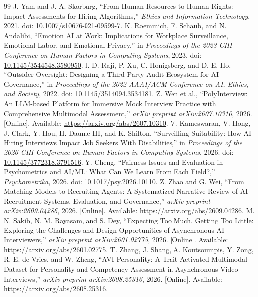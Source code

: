 \documentclass[journal]{IEEEtran}
\begin{document}
\begin{thebibliography}{99}
 J. Yam and J. A. Skorburg, ``From Human Resources to Human Rights: Impact Assessments for Hiring Algorithms,'' \emph{Ethics and Information Technology}, 2021. doi: \href{https://doi.org/10.1007/s10676-021-09599-7}{10.1007/s10676-021-09599-7}.
 K. Roemmich, F. Schaub, and N. Andalibi, ``Emotion AI at Work: Implications for Workplace Surveillance, Emotional Labor, and Emotional Privacy,'' in \emph{Proceedings of the 2023 CHI Conference on Human Factors in Computing Systems}, 2023. doi: \href{https://doi.org/10.1145/3544548.3580950}{10.1145/3544548.3580950}.
 I. D. Raji, P. Xu, C. Honigsberg, and D. E. Ho, ``Outsider Oversight: Designing a Third Party Audit Ecosystem for AI Governance,'' in \emph{Proceedings of the 2022 AAAI/ACM Conference on AI, Ethics, and Society}, 2022. doi: \href{https://doi.org/10.1145/3514094.3534181}{10.1145/3514094.3534181}.
 Z. Wen et al., ``PolyInterview: An LLM-based Platform for Immersive Mock Interview Practice with Comprehensive Multimodal Assessment,'' \emph{arXiv preprint arXiv:2607.10310}, 2026. [Online]. Available: \url{https://arxiv.org/abs/2607.10310}.
 V. Kameswaran, V. Hong, J. Clark, Y. Hou, H. Daume III, and K. Shilton, ``Surveilling Suitability: How AI Hiring Interviews Impact Job Seekers With Disabilities,'' in \emph{Proceedings of the 2026 CHI Conference on Human Factors in Computing Systems}, 2026. doi: \href{https://doi.org/10.1145/3772318.3791516}{10.1145/3772318.3791516}.
 Y. Cheng, ``Fairness Issues and Evaluation in Psychometrics and AI/ML: What Can We Learn From Each Field?,'' \emph{Psychometrika}, 2026. doi: \href{https://doi.org/10.1017/psy.2026.10110}{10.1017/psy.2026.10110}.
 Z. Zhao and G. Wei, ``From Matching Models to Recruiting Agents: A Systematized Narrative Review of AI Recruitment Systems, Evaluation, and Governance,'' \emph{arXiv preprint arXiv:2609.04286}, 2026. [Online]. Available: \url{https://arxiv.org/abs/2609.04286}.
 M. N. Sakib, N. M. Rayasam, and S. Dey, ``Expecting Too Much, Getting Too Little: Exploring the Challenges and Design Opportunities of Asynchronous AI Interviewers,'' \emph{arXiv preprint arXiv:2601.02775}, 2026. [Online]. Available: \url{https://arxiv.org/abs/2601.02775}.
 T. Zhang, J. Shang, A. Koutsoumpis, Y. Zong, R. E. de Vries, and W. Zheng, ``AVI-Personality: A Trait-Activated Multimodal Dataset for Personality and Competency Assessment in Asynchronous Video Interviews,'' \emph{arXiv preprint arXiv:2608.25316}, 2026. [Online]. Available: \url{https://arxiv.org/abs/2608.25316}.

\end{thebibliography}
\end{document}
